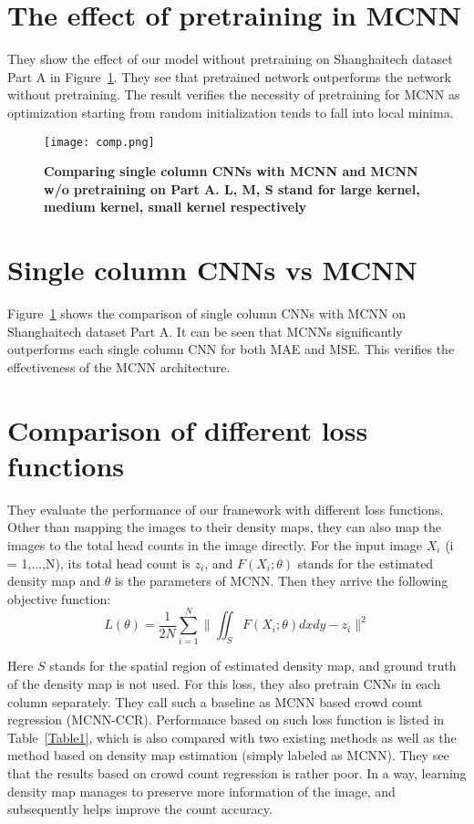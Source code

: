 \documentclass[10pt,twocolumn,letterpaper]{article}
\begin{document}
\section{The effect of pretraining in MCNN}
  They show the effect of our model without pretraining on Shanghaitech dataset Part A in Figure~\ref{Figure1}. They see that pretrained network outperforms the network without pretraining. The result verifies the necessity of pretraining for MCNN as optimization starting from random initialization tends to fall into local minima.
   \begin{figure}[!htb]
 \centering
 \texttt{[image: comp.png]}\\
 \caption{\textbf{Comparing single column CNNs with MCNN and MCNN w/o pretraining on Part A. L, M, S stand for large kernel, medium kernel, small kernel respectively}}\label{Figure1}
 \end{figure}
\section{Single column CNNs vs MCNN}
Figure~\ref{Figure1} shows the comparison of single column CNNs with MCNN on Shanghaitech dataset Part A. It can be seen that MCNNs significantly outperforms each single column CNN for both MAE and MSE. This verifies the effectiveness of the MCNN architecture.
\section{Comparison of different loss functions}
  They evaluate the performance of our framework with different loss functions. Other than mapping the images to their density maps, they can also map the images to the total head counts in the image directly. For the input image $X_i$ (i = 1,...,N), its total head count is $z_i$, and $F(X_i;\theta)$ stands for the estimated density map and $\theta$ is the parameters of MCNN. Then they arrive the following objective function:
\begin{equation}
L(\theta)=\frac{1}{2N}\sum_{i=1}^{N}\|\iint_{S}F(X_i;\theta)dxdy-z_i\|^2
\end{equation}
\par Here $S$ stands for the spatial region of estimated density map, and ground truth of the density map is not used. For this loss, they also pretrain CNNs in each column separately. They call such a baseline as MCNN based crowd count regression (MCNN-CCR). Performance based on such loss function is listed in Table~\ref{Table1}, which is also compared with two existing methods as well as the method based on density map estimation (simply labeled as MCNN). They see that the results based on crowd count regression is rather poor. In a way, learning density map manages to preserve more information of the image, and subsequently helps improve the count accuracy.
\end{document}
